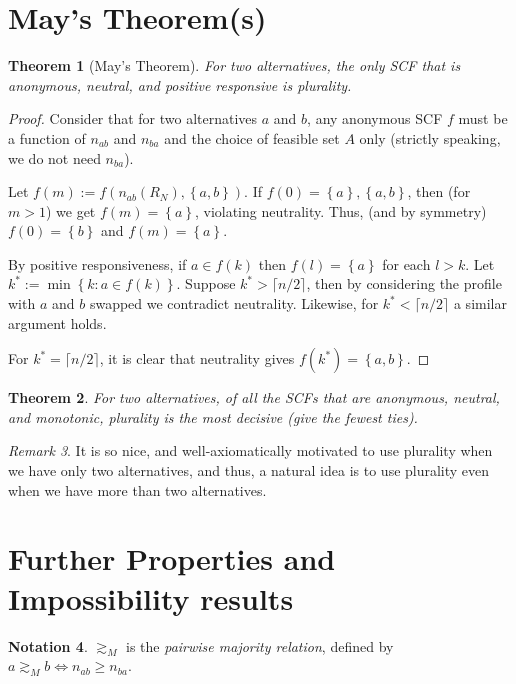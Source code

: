 \documentclass{book}
\theoremstyle{plain}
\newtheorem{theorem}{Theorem}[subsection]
\theoremstyle{definition}
\newtheorem{notation}[theorem]{Notation}
\theoremstyle{remark}
\newtheorem{remark}[theorem]{Remark}
\newcommand{\set}[1]{\left\{#1\right\}}
\begin{document}
\section{May's Theorem(s)}
\begin{theorem}[May's Theorem]
    For two 
    alternatives, 
    the only SCF that is anonymous, neutral, 
    and positive responsive is 
    plurality.
\end{theorem}
\begin{proof}
    Consider that 
    for two 
    alternatives $a$ and $b$,
    any anonymous SCF $f$ must be a function of 
    $n_{ab}$ and $n_{ba}$ and the choice of 
    feasible set $A$ only (strictly speaking, we do not need $n_{ba}$).

    Let $f(m) := f(n_{ab}(R_N), \set{a, b})$.
    If $f(0) = \set{a}, \set{a, b}$, then (for 
    $m > 1$) we get $f(m) = \set{a}$, violating neutrality.
    Thus, (and by symmetry) $f(0) =  \set{b}$ and 
    $f(m) = \set{a}$.

    By positive responsiveness, 
    if $a \in f(k)$ then 
    $f(l) = \set{a}$ for each 
    $l > k$.
    Let $k^* := \min\set{k : a \in f(k)}$.
    Suppose 
    $k^* > \lceil n/2 \rceil$, 
    then by considering the profile with 
    $a$ and $b$ swapped we contradict neutrality.
    Likewise, for $k^* < \lceil n/2 \rceil$
    a similar argument holds.

    For $k^* = \lceil n/2 \rceil$,
    it is clear that neutrality 
    gives 
    $f(k^*) = \set{a, b}$.

\end{proof}

\begin{theorem}
    For two alternatives, 
    of all the SCFs that are 
    anonymous, neutral, and monotonic,
    plurality is the most \emph{decisive} (give the fewest 
    ties).
\end{theorem}

\begin{remark}
    It is so nice, and well-axiomatically motivated
    to use plurality when we have only two alternatives,
    and thus, a natural idea is 
    to use plurality even when we have more than two alternatives.
\end{remark}

\section{Further Properties and Impossibility results}
\begin{notation}
    $\gtrsim_M$ is the \emph{pairwise majority relation}, 
    defined by 
    $a \gtrsim_M b \iff n_{ab} \geq n_{ba}$.
\end{notation}
\end{document}
